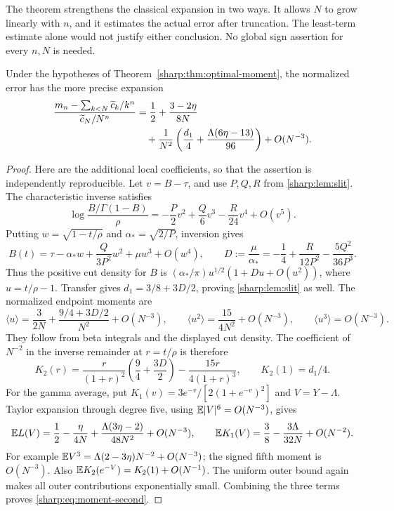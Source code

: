 The theorem strengthens the classical expansion in two ways.
It allows \(N\) to grow linearly with \(n\), and it estimates the
actual error after truncation. The least-term estimate alone would
not justify either conclusion. No global sign assertion for every
\(n,N\) is needed.

\begin{corollary}\label{sharp:cor:moment-second}
Under the hypotheses of Theorem~\ref{sharp:thm:optimal-moment}, the normalized
error has the more precise expansion
\begin{align}
 \frac{m_n-\sum_{k<N}\widetilde c_k/k^n}{\widetilde c_N/N^n}
 &=\frac12+\frac{3-2\eta}{8N}\notag\\
 &\quad+\frac1{N^2}
 \left(\frac{d_1}{4}+\frac{\Lambda(6\eta-13)}{96}\right)
 +O(N^{-3}).\label{sharp:eq:moment-second}
\end{align}
\end{corollary}

\begin{proof}
Here are the additional local coefficients, so that the assertion is
independently reproducible. Let \(v=B-\tau\), and use \(P,Q,R\)
from \eqref{sharp:lem:slit}. The characteristic inverse satisfies
\[
 \log\frac{B/\Gamma(1-B)}{\rho}
 =-\frac{P}{2}v^2+\frac{Q}{6}v^3-\frac{R}{24}v^4+O(v^5).
\]
Putting \(w=\sqrt{1-t/\rho}\) and
\(\alpha_*=\sqrt{2/P}\), inversion gives
\[
 B(t)=\tau-\alpha_* w+\frac{Q}{3P^2}w^2+\mu w^3+O(w^4),
 \qquad
 D:=\frac{\mu}{\alpha_*}
 =-\frac14+\frac{R}{12P^2}-\frac{5Q^2}{36P^3}.
\]
Thus the positive cut density for \(B\) is
\((\alpha_*/\pi)u^{1/2}(1+Du+O(u^2))\), where \(u=t/\rho-1\).
Transfer gives \(d_1=3/8+3D/2\), proving
\eqref{sharp:lem:slit} as well. The normalized endpoint moments are
\[
 \langle u\rangle=\frac{3}{2N}
       +\frac{9/4+3D/2}{N^2}+O(N^{-3}),\qquad
 \langle u^2\rangle=\frac{15}{4N^2}+O(N^{-3}),\qquad
 \langle u^3\rangle=O(N^{-3}).
\]
They follow from beta integrals and the displayed cut density.
The coefficient of \(N^{-2}\) in the inverse remainder at \(r=t/\rho\)
is therefore
\[
 K_2(r)=\frac{r}{(1+r)^2}\left(\frac94+\frac{3D}{2}\right)
                    -\frac{15r}{4(1+r)^3},\qquad K_2(1)=d_1/4.
\]
For the gamma average, put
\(K_1(v)=3e^{-v}/[2(1+e^{-v})^2]\) and \(V=Y-\Lambda\).
Taylor expansion through degree five, using
\(\mathbb E|V|^6=O(N^{-3})\), gives
\[
 \mathbb E L(V)=\frac12-\frac{\eta}{4N}
       +\frac{\Lambda(3\eta-2)}{48N^2}+O(N^{-3}),\qquad
 \mathbb E K_1(V)=\frac38-\frac{3\Lambda}{32N}+O(N^{-2}).
\]
For example \(\mathbb E V^3=\Lambda(2-3\eta)N^{-2}+O(N^{-3})\);
the signed fifth moment is \(O(N^{-3})\).
Also \(\mathbb E K_2(e^{-V})=K_2(1)+O(N^{-1})\).
The uniform outer bound again makes all outer contributions
exponentially small. Combining the three terms proves
\eqref{sharp:eq:moment-second}.
\end{proof}

